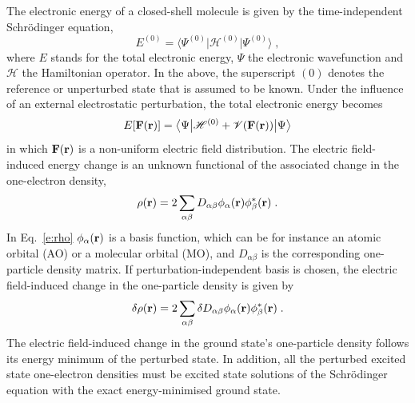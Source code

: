 \documentclass[aip,amsmath,amssymb,reprint,floatfix]{revtex4-1}
\newcommand{\tbraket}[3]{\ensuremath{\bigl\langle {#1} \bigl\lvert {#2} \bigl\lvert {#3} \bigr\rangle}}
\begin{document}
The electronic energy of a closed\hyp{}shell molecule is given by the time\hyp{}independent Schr{\"o}dinger equation,
%
\begin{equation}
 E^{(0)} = \tbraket{\Psi^{(0)}}{\mathscr{H}^{(0)}}{\Psi^{(0)}} \;,
\end{equation}
%
where $E$ stands for the total electronic energy, $\Psi$ the electronic wavefunction and $\mathscr{H}$
the Hamiltonian operator. In the above, the superscript $(0)$
denotes the reference or unperturbed state that is assumed to be known.
Under the influence of an external electrostatic perturbation, the total electronic energy
becomes
%
\begin{equation}
 E[{\bf F}({\bf r})] = \tbraket{\Psi}{\mathscr{H}^{(0)} + \mathscr{V}({\bf F}({\bf r}))}{\Psi}
\end{equation}
%
in which ${\bf F}({\bf r})$ is a non\hyp{}uniform electric field distribution.
The electric field\hyp{}induced energy change is an unknown functional 
of the associated change in the one\hyp{}electron density,
%
\begin{equation}\label{e:rho}
 \rho({\bf r}) = 2\sum_{\alpha\beta} D_{\alpha\beta} \phi_\alpha({\bf r}) \phi^*_\beta({\bf r}) \;.
\end{equation}
%
In Eq.~\eqref{e:rho} $\phi_\alpha({\bf r})$ is a basis function, which can be for instance 
an atomic orbital (AO) or a molecular orbital (MO), and $D_{\alpha\beta}$ is the corresponding
one\hyp{}particle density matrix.
If perturbation\hyp{}independent basis is chosen, the electric field\hyp{}induced change in the one\hyp{}particle density
is given by
%
\begin{equation}\label{e:rho-1}
 \delta \rho({\bf r}) = 2\sum_{\alpha\beta} \delta D_{\alpha\beta} \phi_\alpha({\bf r}) \phi^*_\beta({\bf r}) \;.
\end{equation}
%
The electric field\hyp{}induced change in the ground state's one\hyp{}particle density 
follows its energy minimum of the perturbed state. In addition, all the perturbed 
excited state one\hyp{}electron densities must be excited state solutions of the Schr{\"o}dinger equation
with the exact energy\hyp{}minimised ground state. 
\end{document}
